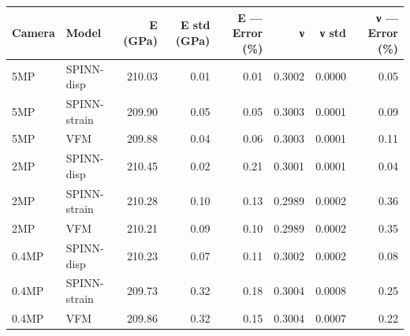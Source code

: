 \begin{tabular}{llrrrrrr}
\toprule
Camera & Model & E (GPa) & E std (GPa) & E — Error (\%) & ν & ν std & ν — Error (\%) \\
\midrule
5MP & SPINN-disp & 210.03 & 0.01 & 0.01 & 0.3002 & 0.0000 & 0.05 \\
5MP & SPINN-strain & 209.90 & 0.05 & 0.05 & 0.3003 & 0.0001 & 0.09 \\
5MP & VFM & 209.88 & 0.04 & 0.06 & 0.3003 & 0.0001 & 0.11 \\
2MP & SPINN-disp & 210.45 & 0.02 & 0.21 & 0.3001 & 0.0001 & 0.04 \\
2MP & SPINN-strain & 210.28 & 0.10 & 0.13 & 0.2989 & 0.0002 & 0.36 \\
2MP & VFM & 210.21 & 0.09 & 0.10 & 0.2989 & 0.0002 & 0.35 \\
0.4MP & SPINN-disp & 210.23 & 0.07 & 0.11 & 0.3002 & 0.0002 & 0.08 \\
0.4MP & SPINN-strain & 209.73 & 0.32 & 0.18 & 0.3004 & 0.0008 & 0.25 \\
0.4MP & VFM & 209.86 & 0.32 & 0.15 & 0.3004 & 0.0007 & 0.22 \\
\bottomrule
\end{tabular}

